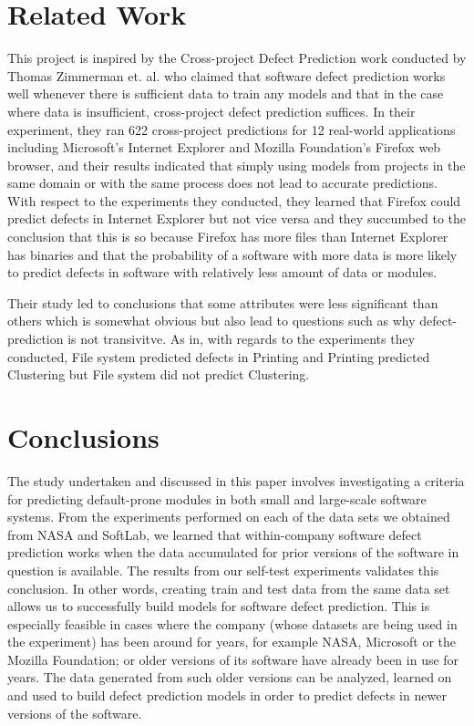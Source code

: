 \documentclass{sig-alternate}
\begin{document}
\section{Related Work}
This project is inspired by the Cross-project Defect Prediction work conducted by Thomas Zimmerman et. al. who claimed that software defect prediction works well whenever there is sufficient data to train any models and that in the case where data is insufficient, cross-project defect prediction suffices\cite{zimmerman09}. In their experiment, they ran 622 cross-project predictions for 12 real-world applications including Microsoft's Internet Explorer and Mozilla Foundation's Firefox web browser, and their results indicated that simply using models from projects in the same domain or with the same process does not lead to accurate predictions. With respect to the experiments they conducted, they learned that Firefox could predict defects in Internet Explorer but not vice versa and they succumbed to the conclusion that this is so because Firefox has more files than Internet Explorer has binaries and that the probability of a software with more data is more likely to predict defects in software with relatively less amount of data or modules. 

Their study led to conclusions that some attributes were less significant than others which is somewhat obvious but also lead to questions such as why defect-prediction is not transivitve. As in, with regards to the experiments they conducted, File system predicted defects in Printing and Printing predicted Clustering but File system did not predict Clustering.

\newpage
\section{Conclusions}
The study undertaken and discussed in this paper involves investigating a criteria for predicting default-prone modules in both small and large-scale software systems. From the experiments performed on each of the data sets we obtained from NASA and SoftLab, we learned that within-company software defect prediction works when the data accumulated for prior versions of the software in question is available. The results from our self-test experiments validates this conclusion. In other words, creating train and test data from the same data set allows us to successfully build models for software defect prediction. This is especially feasible in cases where the company (whose datasets are being used in the experiment) has been around for years, for example NASA, Microsoft or the Mozilla Foundation; or older versions of its software have already been in use for years. The data generated from such older versions can be analyzed, learned on and used to build defect prediction models in order to predict defects in newer versions of the software.
\end{document}
